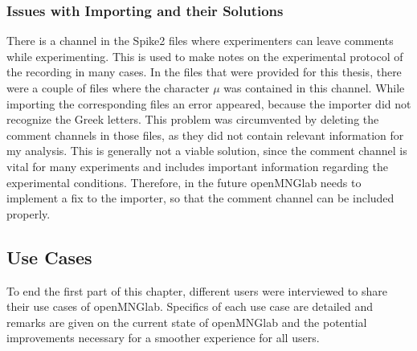 \subsubsection{Issues with Importing and their Solutions}
There is a channel in the Spike2 files where experimenters can leave comments while experimenting. This is used to make notes on the experimental protocol of the recording in many cases. In the files that were provided for this thesis, there were a couple of files where the character $\mu$ was contained in this channel. While importing the corresponding files an error appeared, because the importer did not recognize the Greek letters. This problem was circumvented by deleting the comment channels in those files, as they did not contain relevant information for my analysis. This is generally not a viable solution, since the comment channel is vital for many experiments and includes important information regarding the experimental conditions. Therefore, in the future openMNGlab needs to implement a fix to the importer, so that the comment channel can be included properly.

\subsection{Use Cases}
To end the first part of this chapter, different users were interviewed to share their use cases of openMNGlab. Specifics of each use case are detailed and remarks are given on the current state of openMNGlab and the potential improvements necessary for a smoother experience for all users.

